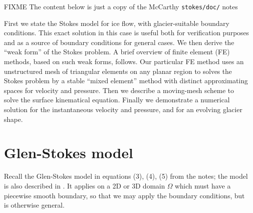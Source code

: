 \documentclass[letterpaper,final,12pt,reqno]{amsart}
\begin{document}
FIXME The content below is just a copy of the McCarthy \texttt{stokes/doc/} notes

First we state the Stokes model for ice flow, with glacier-suitable boundary conditions.  This exact solution in this case is useful both for verification purposes and as a source of boundary conditions for general cases.  We then derive the ``weak form'' of the Stokes problem.  A brief overview of finite element (FE) methods, based on such weak forms, follows.  Our particular FE method uses an unstructured mesh of triangular elements on any planar region to solves the Stokes problem by a stable ``mixed element'' method with distinct approximating spaces for velocity and pressure.  Then we describe a moving-mesh scheme to solve the surface kinematical equation.  Finally we demonstrate a numerical solution for the instantaneous velocity and pressure, and for an evolving glacier shape.


\section{Glen-Stokes model} \label{sec:stokes}

Recall the Glen-Stokes model in equations (3), (4), (5) from the notes; the model is also described in \cite{GreveBlatter2009,JouvetRappaz2011}.  It applies on a 2D or 3D domain $\Omega$ which must have a piecewise smooth boundary, so that we may apply the boundary conditions, but is otherwise general.
\end{document}
